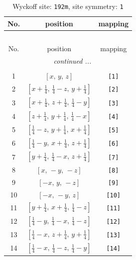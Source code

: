 \documentclass[fleqn,8pt]{jsarticle}
\begin{document}
\begin{longtable}{ccc}
\caption{Wyckoff site: {\tt 192m}, site symmetry: {\tt 1}}
 \\
 \hline \hline
No. & position & mapping \\ \hline \endfirsthead

\multicolumn{2}{l}{\tablename\ \thetable{}} \\
 \hline \hline
No. & position & mapping \\ \hline \endhead

 \hline \hline
\multicolumn{2}{r}{\footnotesize\it continued ...} \\ \endfoot

 \hline \hline
\multicolumn{2}{r}{} \\ \endlastfoot

1 & $\left[ x,\, y,\, z \right]$ & {\tt [1]} \\ \hline
2 & $\left[ x + \frac{1}{4},\, \frac{1}{4} - z,\, y + \frac{1}{4} \right]$ & {\tt [2]} \\ \hline
3 & $\left[ x + \frac{1}{4},\, z + \frac{1}{4},\, \frac{1}{4} - y \right]$ & {\tt [3]} \\ \hline
4 & $\left[ z + \frac{1}{4},\, y + \frac{1}{4},\, \frac{1}{4} - x \right]$ & {\tt [4]} \\ \hline
5 & $\left[ \frac{1}{4} - z,\, y + \frac{1}{4},\, x + \frac{1}{4} \right]$ & {\tt [5]} \\ \hline
6 & $\left[ \frac{1}{4} - y,\, x + \frac{1}{4},\, z + \frac{1}{4} \right]$ & {\tt [6]} \\ \hline
7 & $\left[ y + \frac{1}{4},\, \frac{1}{4} - x,\, z + \frac{1}{4} \right]$ & {\tt [7]} \\ \hline
8 & $\left[ x,\, - y,\, - z \right]$ & {\tt [8]} \\ \hline
9 & $\left[ - x,\, y,\, - z \right]$ & {\tt [9]} \\ \hline
10 & $\left[ - x,\, - y,\, z \right]$ & {\tt [10]} \\ \hline
11 & $\left[ y + \frac{1}{4},\, x + \frac{1}{4},\, \frac{1}{4} - z \right]$ & {\tt [11]} \\ \hline
12 & $\left[ \frac{1}{4} - y,\, \frac{1}{4} - x,\, \frac{1}{4} - z \right]$ & {\tt [12]} \\ \hline
13 & $\left[ \frac{1}{4} - x,\, z + \frac{1}{4},\, y + \frac{1}{4} \right]$ & {\tt [13]} \\ \hline
14 & $\left[ \frac{1}{4} - x,\, \frac{1}{4} - z,\, \frac{1}{4} - y \right]$ & {\tt [14]} \\ \hline

\end{longtable}
\end{document}
